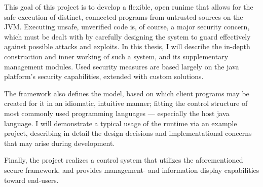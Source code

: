 This goal of this project is to develop a flexible, open runime that allows for the safe execution of distinct, connected programs from untrusted sources on the JVM. Executing unsafe, unverified code is, of course, a major security concern, which must be dealt with by carefully designing the system to guard effectively against possible attacks and exploits. In this thesis, I will describe the in-depth construction and inner working of such a system, and its supplementary management modules. Used security measures are based largely on the java platform's security capabilities, extended with custom solutions.

The framework also defines the model, based on which client programs may be created for it in an idiomatic, intuitive manner; fitting the control structure of most commonly used programming languages --- especially the host java language. I will demonstrate a typical usage of the runtime via an example project, describing in detail the design decisions and implementational concerns that may arise during development.

Finally, the project realizes a control system that utilizes the aforementioned secure framework, and provides management- and information display capabilities toward end-users.


\vfill

%